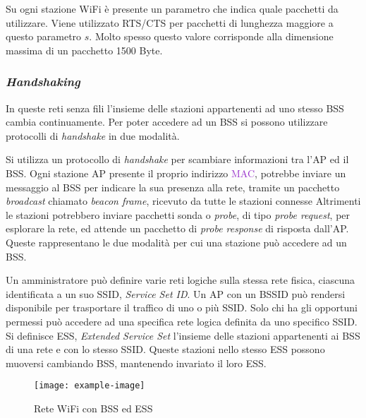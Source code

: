 \documentclass{article}
\numberwithin{equation}{subsection}
\begin{document}
Su ogni stazione \textcolor{Sepia}{WiFi} è presente un parametro che indica quale pacchetti da utilizzare. Viene utilizzato \textcolor{Dandelion}{RTS}/\textcolor{Dandelion}{CTS} per pacchetti di lunghezza maggiore a questo parametro $s$. Molto spesso questo valore corrisponde alla dimensione massima di un pacchetto 1500 Byte. 

\subsubsection{\textit{Handshaking}}

In queste reti senza fili l'insieme delle stazioni appartenenti ad uno stesso \textcolor{Rhodamine}{BSS} cambia continuamente. Per poter accedere ad un \textcolor{Rhodamine}{BSS} si possono utilizzare 
protocolli di \textit{handshake} in due modalità. 

Si utilizza un protocollo di \textit{handshake} per scambiare informazioni tra l'\textcolor{PineGreen}{AP} ed il \textcolor{Rhodamine}{BSS}. Ogni stazione \textcolor{PineGreen}{AP} presente il proprio indirizzo \textcolor{DarkOrchid}{MAC}, potrebbe inviare un messaggio 
al \textcolor{Rhodamine}{BSS} per indicare la sua presenza alla rete, tramite un pacchetto \textit{broadcast} chiamato \textit{beacon frame}, ricevuto da tutte le stazioni connesse
Altrimenti le stazioni potrebbero inviare pacchetti sonda o \textit{probe}, di tipo \textit{probe \textit{request}}, per esplorare la rete, ed attende un pacchetto di \textit{probe response} di risposta dall'\textcolor{PineGreen}{AP}. Queste rappresentano le due modalità per cui una stazione può accedere ad un \textcolor{Rhodamine}{BSS}. 

Un amministratore può definire varie reti logiche sulla stessa rete fisica, ciascuna identificata a un suo SSID, \textit{Service Set ID}. Un \textcolor{PineGreen}{AP} con un \textcolor{Rhodamine}{BSSID} può rendersi disponibile per trasportare il traffico di uno o più SSID. 
Solo chi ha gli opportuni permessi può accedere ad una specifica rete logica definita da uno specifico SSID. Si definisce ESS, \textit{Extended Service Set} l'insieme delle stazioni appartenenti 
ai \textcolor{Rhodamine}{BSS} di una rete e con lo stesso SSID. 
Queste stazioni nello stesso ESS possono muoversi cambiando \textcolor{Rhodamine}{BSS}, mantenendo invariato il loro ESS. 

\begin{figure}[H]%
    \centering%
    \texttt{[image: example-image]}%
    \caption{Rete \textcolor{Sepia}{WiFi} con \textcolor{Rhodamine}{BSS} ed ESS}%
\end{figure}
\end{document}
